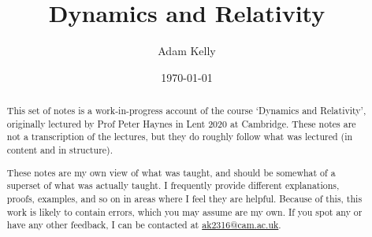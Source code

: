 \documentclass[a4paper]{scrartcl}
\title{Dynamics and Relativity}
\author{Adam Kelly}
\date{\today}
\newcommand{\newchapter}{\section}
\begin{document}
\maketitle

\begin{abstract}
	

	This set of notes is a work-in-progress account of the course `Dynamics and Relativity', originally lectured by Prof Peter Haynes in Lent 2020 at Cambridge. These notes are not a transcription of the lectures, but they do roughly follow what was lectured (in content and in structure).

	These notes are my own view of what was taught, and should be somewhat of a superset of what was actually taught. I frequently provide different explanations, proofs, examples, and so on in areas where I feel they are helpful. Because of this, this work is likely to contain errors, which you may assume are my own. If you spot any or have any other feedback, I can be contacted at \href{mailto:ak2316@cam.ac.uk}{ak2316@cam.ac.uk}.



\end{abstract}

\tableofcontents



\end{document}

